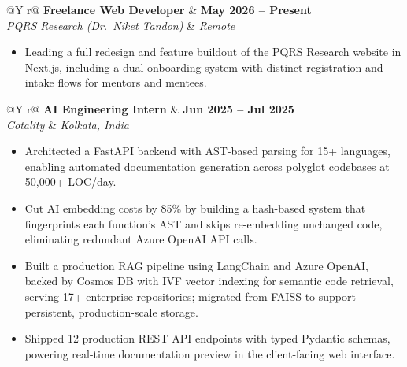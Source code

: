 \documentclass[11pt,letterpaper]{article}
\makeatletter
\newcommand{\cventry}[4]{%
    \begin{tabularx}{\linewidth}{@{}Y r@{}}
        \textbf{#1} & \textbf{\footnotesize #2} \\
        \textit{\footnotesize #3} & \textit{\footnotesize #4} \\
    \end{tabularx}%
    \vspace{0.3ex}
}
\makeatother
\begin{document}
\vspace{0.02ex}
 
\cventry{Freelance Web Developer}{May 2026 -- Present}{PQRS Research (Dr.\ Niket Tandon)}{Remote}
\begin{itemize}
    \item Leading a full redesign and feature buildout of the PQRS Research website in Next.js, including a dual onboarding system with distinct registration and intake flows for mentors and mentees.
\end{itemize}
 
\vspace{0.02ex}
 
\cventry{AI Engineering Intern}{Jun 2025 -- Jul 2025}{Cotality}{Kolkata, India}
\begin{itemize}
    \item Architected a FastAPI backend with AST-based parsing for 15+ languages, enabling automated documentation generation across polyglot codebases at 50,000+ LOC/day.
    \item Cut AI embedding costs by 85\% by building a hash-based system that fingerprints each function's AST and skips re-embedding unchanged code, eliminating redundant Azure OpenAI API calls.
    \item Built a production RAG pipeline using LangChain and Azure OpenAI, backed by Cosmos DB with IVF vector indexing for semantic code retrieval, serving 17+ enterprise repositories; migrated from FAISS to support persistent, production-scale storage.
    \item Shipped 12 production REST API endpoints with typed Pydantic schemas, powering real-time documentation preview in the client-facing web interface.
\end{itemize}
 
%
 
\end{document}
